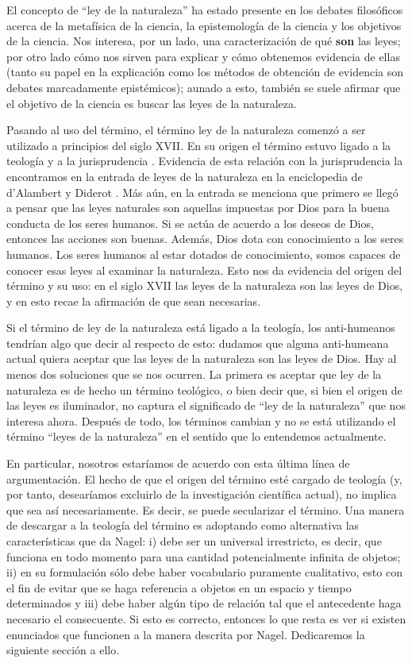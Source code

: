 \noindent El concepto de ``ley de la naturaleza'' ha estado presente en los debates filosóficos acerca de la metafísica de la ciencia, la epistemología de la ciencia y los objetivos de la ciencia. Nos interesa, por un lado, una caracterización de qué \textbf{son} las leyes; por otro lado cómo nos sirven para explicar y cómo obtenemos evidencia de ellas (tanto su papel en la explicación como los métodos de obtención de evidencia son debates marcadamente epistémicos); aunado a esto, también se suele afirmar que el objetivo de la ciencia es buscar las leyes de la naturaleza.

Pasando al uso del término, el término ley de la naturaleza comenzó a ser utilizado a principios del siglo XVII. En su origen el término estuvo ligado a la teología y a la jurisprudencia \cite{Giere2006, Giere1999}. Evidencia de esta relación con la jurisprudencia la encontramos en la entrada de leyes de la naturaleza en la enciclopedia de d'Alambert y Diderot \cite{lawna}. Más aún, en la entrada se menciona que primero se llegó a pensar que las leyes naturales son aquellas impuestas por Dios para la buena conducta de los seres humanos. Si se actúa de acuerdo a los deseos de Dios, entonces las acciones son buenas. Además, Dios dota con conocimiento a los seres humanos. Los seres humanos al estar dotados de conocimiento, somos capaces de conocer esas leyes al examinar la naturaleza. Esto nos da evidencia del origen del término y su uso: en el siglo XVII las leyes de la naturaleza son las leyes de Dios, y en esto recae la afirmación de que sean necesarias.

Si el término de ley de la naturaleza está ligado a la teología, los anti-humeanos tendrían algo que decir al respecto de esto: dudamos que alguna anti-humeana actual quiera aceptar que las leyes de la naturaleza son las leyes de Dios. Hay al menos dos soluciones que se nos ocurren. La primera es aceptar que ley de la naturaleza es de hecho un término teológico, o bien decir que, si bien el origen de las leyes es iluminador, no captura el significado de ``ley de la naturaleza'' que nos interesa ahora. Después de todo, los términos cambian y no se está utilizando el término ``leyes de la naturaleza'' en el sentido que lo entendemos actualmente.

En particular, nosotros estaríamos de acuerdo con esta última línea de argumentación. El hecho de que el origen del término esté cargado de teología (y, por tanto, desearíamos excluirlo de la investigación científica actual), no implica que sea así necesariamente. Es decir, se puede secularizar el término. Una manera de descargar a la teología del término es adoptando como alternativa las características que da Nagel: i) debe ser un universal irrestricto, es decir, que funciona en todo momento para una cantidad potencialmente infinita de objetos; ii) en su formulación sólo debe haber vocabulario puramente cualitativo, esto con el fin de evitar que se haga referencia a objetos en un espacio y tiempo determinados y iii) debe haber algún tipo de relación tal que el antecedente haga necesario el consecuente. Si esto es correcto, entonces lo que resta es ver si existen enunciados que funcionen a la manera descrita por Nagel. Dedicaremos la siguiente sección a ello.

